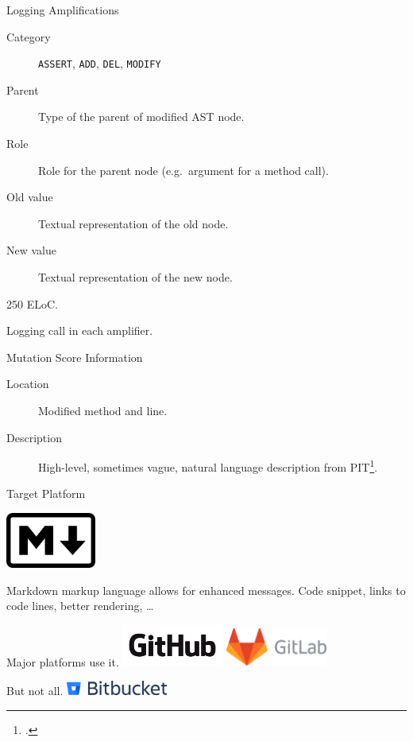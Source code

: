 \documentclass[aspectratio=169,dvipsnames]{beamer}
\begin{document}
\begin{frame}{Logging Amplifications}
  \begin{description}
    \item[Category] \texttt{ASSERT}, \texttt{ADD}, \texttt{DEL}, \texttt{MODIFY}
    \item[Parent] Type of the parent of modified AST node.
    \item[Role] Role for the parent node (e.g.\ argument for a method call).
    \item[Old value] Textual representation of the old node.
    \item[New value] Textual representation of the new node.
  \end{description}

  \pause{}

  250 ELoC.

  Logging call in each amplifier.
\end{frame}

\begin{frame}{Mutation Score Information}
  \begin{description}
    \item[Location] Modified method and line.
    \item[Description] High-level, sometimes vague, natural language description from PIT\footcite{coles2016pit}.
  \end{description}
\end{frame}

\begin{frame}{Target Platform}
  \begin{center}
    \includegraphics[width=8em]{markdown-logo}

    Markdown markup language allows for enhanced messages.
    Code snippet, links to code lines, better rendering, \dots
  \end{center}

  Major platforms use it.
  \includegraphics[width=9em]{GitHub_Logo}
  \includegraphics[width=9em]{wm_no_bg}

  \vfill{}

  But not all.
  \includegraphics[width=9em]{Bitbucket-blue}
\end{frame}
\end{document}
